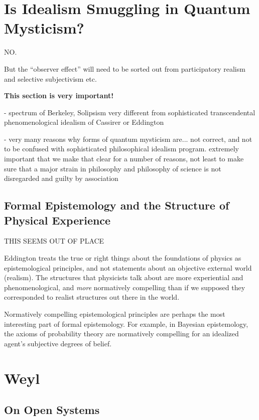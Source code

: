 \section{Is Idealism Smuggling in Quantum Mysticism?}

NO.

But the ``observer effect'' will need to be sorted out from participatory realism and selective subjectivism etc.

\textbf{This section is very important!}

- spectrum of Berkeley, Solipsism very different from sophisticated transcendental phenomenological idealism of Cassirer or Eddington  

- very many reasons why forms of quantum mysticism are... not correct, and not to be confused with sophisticated philosophical idealism program.  extremely important that we make that clear for a number of reasons, not least to make sure that a major strain in philosophy and philosophy of science is not disregarded and guilty by association






\subsection{Formal Epistemology and the Structure of Physical Experience}

THIS SEEMS OUT OF PLACE

Eddington treats the true or right things about the foundations of physics as epistemological principles, and not statements about an objective external world (realism).  The structures that physicists talk about are more experiential and phenomenological, and \emph{more} normatively compelling than if we supposed they corresponded to realist structures out there in the world.  

Normatively compelling epistemological principles are perhaps the most interesting part of formal epistemology.  For example, in Bayesian epistemology, the axioms of probability theory are normatively compelling for an idealized agent's subjective degrees of belief.  





\section{Weyl}

\subsection{On Open Systems}

